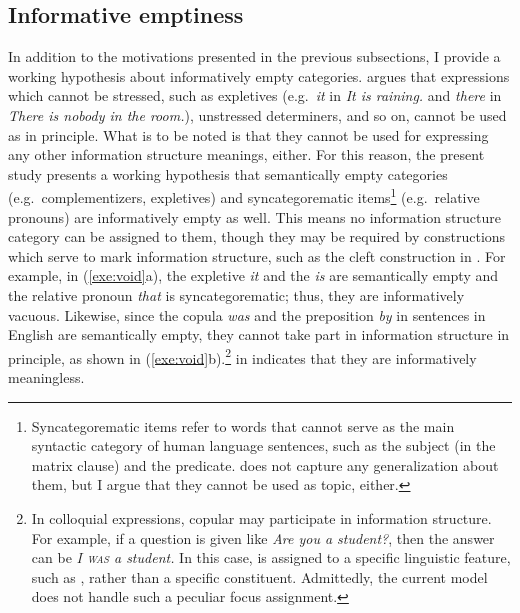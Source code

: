 \subsection{Informative emptiness}  
\label{9:sec:hypotheses}


In addition to the motivations presented in the previous subsections,
I provide a working hypothesis about informatively empty categories.
\citet[156]{lambrecht:96} argues that expressions which cannot be
stressed, such as expletives (e.g.\ \textit{it} in \textit{It is
  raining.} and \textit{there} in \textit{There is nobody in the
  room.}), unstressed determiners, and so on, cannot be used as 
in principle.  What is to be noted is that they cannot be used for
expressing any other information structure meanings, either.  For this
reason, the present study presents a working hypothesis that
semantically empty categories (e.g.\ complementizers, expletives) and
syncategorematic items\footnote{Syncategorematic items refer to words
  that cannot serve as the main syntactic category of human language
  sentences, such as the subject (in the matrix clause) and the
  predicate.  \citet{lambrecht:96} does not capture any generalization
  about them, but I argue that they cannot be used as topic, either.}
(e.g.\ relative pronouns) are informatively empty as well. This means
no information structure category can be assigned to them, though they
may be required by constructions which serve to mark information
structure, such as the cleft construction in
. For example, in
(\ref{exe:void}a), the expletive \textit{it} and the  
\textit{is} are semantically empty and the relative pronoun \textit{that} is
syncategorematic; thus, they are informatively vacuous. Likewise,
since the copula \textit{was} and the preposition \textit{by} in
 sentences in English are semantically empty, they cannot
take part in information structure in principle, as shown in
(\ref{exe:void}b).\footnote{In colloquial expressions, copular may
  participate in information structure.  For example, if a question is
  given like \textit{Are you a student?}, then the answer can be
  \textit{I \textsc{was} a student.}  In this case,  is assigned
  to a specific linguistic feature, such as , rather than a
  specific constituent.  Admittedly, the current model does not handle
  such a peculiar focus assignment.}   in
 indicates that they are informatively meaningless.





